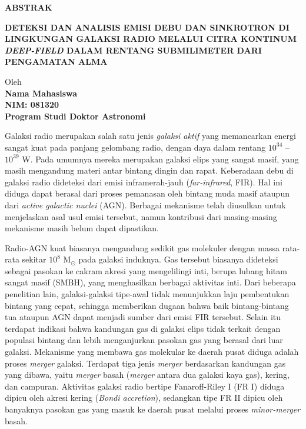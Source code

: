 \begin{center}
\textbf{ABSTRAK}

\vspace{0.5cm}

\textbf{DETEKSI DAN ANALISIS EMISI DEBU DAN SINKROTRON DI LINGKUNGAN GALAKSI RADIO MELALUI 
CITRA KONTINUM \textit{DEEP-FIELD} DALAM RENTANG SUBMILIMETER DARI PENGAMATAN ALMA}\\
\vspace{0.5cm}

Oleh\\
\textbf{Nama Mahasiswa\\
NIM: 081320\\
Program Studi Doktor Astronomi}\\
\end{center}

\vspace{1.0cm}
Galaksi radio merupakan salah satu jenis {\it galaksi aktif} yang memancarkan energi sangat kuat pada panjang gelombang radio, dengan daya dalam rentang $10^{34}$ -- $10^{39}$ W. Pada umumnya mereka merupakan galaksi elips yang sangat masif, yang masih mengandung materi antar bintang dingin dan rapat. Keberadaan debu di galaksi radio dideteksi dari emisi inframerah-jauh (\textit{far-infrared}, FIR). Hal ini diduga dapat berasal dari proses pemanasan oleh bintang muda masif ataupun dari \textit{active galactic nuclei} (AGN). Berbagai mekanisme telah diusulkan untuk menjelaskan asal usul emisi tersebut, namun kontribusi dari masing-masing mekanisme masih belum dapat dipastikan.

Radio-AGN kuat biasanya mengandung sedikit gas molekuler dengan massa rata-rata sekitar $10^8$ M$_\odot$ pada galaksi induknya. Gas tersebut biasanya dideteksi sebagai pasokan ke cakram akresi yang mengelilingi inti, berupa lubang hitam sangat masif (SMBH), yang menghasilkan berbagai aktivitas inti. Dari beberapa penelitian lain, galaksi-galaksi tipe-awal tidak menunjukkan laju pembentukan bintang yang cepat, sehingga memberikan dugaan bahwa baik bintang-bintang tua ataupun AGN dapat menjadi sumber dari emisi FIR tersebut. Selain itu terdapat indikasi bahwa kandungan gas di galaksi elips tidak terkait dengan populasi bintang dan lebih menganjurkan pasokan gas yang berasal dari luar galaksi. Mekanisme yang membawa gas molekular ke daerah pusat diduga adalah proses \textit{merger} galaksi. Terdapat tiga jenis \textit{merger} berdasarkan kandungan gas yang dibawa, yaitu \textit{merger} basah (\textit{merger} antara dua galaksi kaya gas), kering, dan campuran.  Aktivitas galaksi radio bertipe Fanaroff-Riley I (FR I) diduga dipicu oleh akresi kering (\textit{Bondi accretion}), sedangkan tipe FR II dipicu oleh banyaknya pasokan gas yang masuk ke daerah pusat melalui proses \textit{minor-merger} basah.

